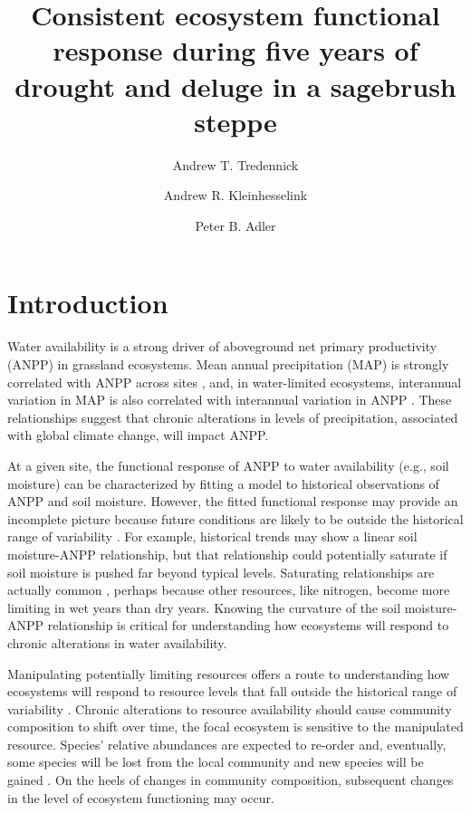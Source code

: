 \documentclass[fleqn,10pt]{wlpeerj} %
\title{Consistent ecosystem functional response during five years of drought
and deluge in a sagebrush steppe}
\author[1]{Andrew T. Tredennick}
\author[2]{Andrew R. Kleinhesselink}
\author[1]{Peter B. Adler}
\affil[1]{Department of Wildland Resources and the Ecology Center, Utah State
University, Logan, Utah 84322}
\affil[2]{Department of Ecology and Evolutionary Biology, University of
California, Los Angeles, Los Angeles, California xxxxx}
\begin{document}
\flushbottom
\maketitle
\thispagestyle{empty}

 
\newcommand{\pba}{\textcolor{blue}} \newcommand{\ark}{\textcolor{red}}

\section{Introduction}\label{introduction}

Water availability is a strong driver of aboveground net primary
productivity (ANPP) in grassland ecosystems. Mean annual precipitation
(MAP) is strongly correlated with ANPP across sites \citep{Huxman2004},
and, in water-limited ecosystems, interannual variation in MAP is also
correlated with interannual variation in ANPP \citep{Hsu2012}. These
relationships suggest that chronic alterations in levels of
precipitation, associated with global climate change, will impact ANPP.

At a given site, the functional response of ANPP to water availability
(e.g., soil moisture) can be characterized by fitting a model to
historical observations of ANPP and soil moisture. However, the fitted
functional response may provide an incomplete picture because future
conditions are likely to be outside the historical range of variability
\citep{Smith2011}. For example, historical trends may show a linear soil
moisture-ANPP relationship, but that relationship could potentially
saturate if soil moisture is pushed far beyond typical levels.
Saturating relationships are actually common \citep{Hsu2012}, perhaps
because other resources, like nitrogen, become more limiting in wet
years than dry years. Knowing the curvature of the soil moisture-ANPP
relationship is critical for understanding how ecosystems will respond
to chronic alterations in water availability.

Manipulating potentially limiting resources offers a route to
understanding how ecosystems will respond to resource levels that fall
outside the historical range of variability \citep{Knapp2017}. Chronic
alterations to resource availability should cause community composition
to shift over time, the focal ecosystem is sensitive to the manipulated
resource. Species' relative abundances are expected to re-order and,
eventually, some species will be lost from the local community and new
species will be gained \citep{Smith2009, Avolio2015}. On the heels of
changes in community composition, subsequent changes in the level of
ecosystem functioning may occur.
\end{document}
